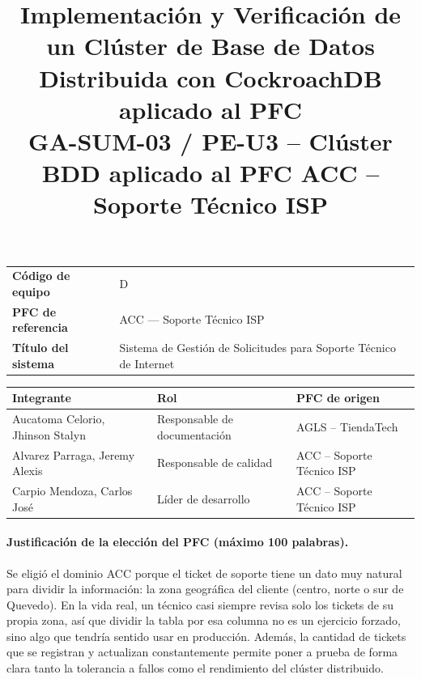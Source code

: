\documentclass[11pt,a4paper]{article}
\title{Implementaci\'on y Verificaci\'on de un Cl\'uster de Base de Datos Distribuida con CockroachDB aplicado al PFC\\
\large GA-SUM-03 / PE-U3 -- Cl\'uster BDD aplicado al PFC ACC -- Soporte T\'ecnico ISP}
\author{}
\date{}
\begin{document}
\maketitle

\begin{center}
\begin{tabular}{ll}
\toprule
\textbf{C\'odigo de equipo} & D \\
\textbf{PFC de referencia} & ACC --- Soporte T\'ecnico ISP \\
\textbf{T\'itulo del sistema} & Sistema de Gesti\'on de Solicitudes para Soporte T\'ecnico de Internet \\
\bottomrule
\end{tabular}
\end{center}

\begin{center}
\begin{tabular}{P{5.2cm}P{4.3cm}P{4.3cm}}
\toprule
\textbf{Integrante} & \textbf{Rol} & \textbf{PFC de origen} \\
\midrule
Aucatoma Celorio, Jhinson Stalyn & Responsable de documentaci\'on & AGLS -- TiendaTech \\
Alvarez Parraga, Jeremy Alexis & Responsable de calidad & ACC -- Soporte T\'ecnico ISP \\
Carpio Mendoza, Carlos Jos\'e & L\'ider de desarrollo & ACC -- Soporte T\'ecnico ISP \\
\bottomrule
\end{tabular}
\end{center}

\paragraph{Justificaci\'on de la elecci\'on del PFC (m\'aximo 100 palabras).}
Se eligi\'o el dominio ACC porque el ticket de soporte tiene un dato muy
natural para dividir la informaci\'on: la zona geogr\'afica del cliente
(centro, norte o sur de Quevedo). En la vida real, un t\'ecnico casi siempre
revisa solo los tickets de su propia zona, as\'i que dividir la tabla por esa
columna no es un ejercicio forzado, sino algo que tendr\'ia sentido usar en
producci\'on. Adem\'as, la cantidad de tickets que se registran y actualizan
constantemente permite poner a prueba de forma clara tanto la tolerancia a
fallos como el rendimiento del cl\'uster distribuido.
\end{document}

